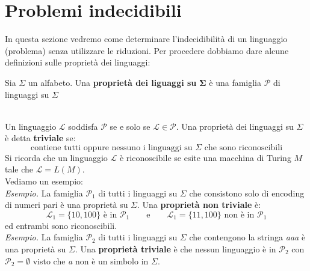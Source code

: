 \section{Problemi indecidibili} 
In questa sezione vedremo come determinare l'indecidibilità di un linguaggio (problema) 
senza utilizzare le riduzioni. Per procedere dobbiamo dare alcune definizioni sulle proprietà dei linguaggi:\smallskip\\
\colorbox{SALZO}{\parbox{\dimexpr\linewidth-2\fboxsep}{\begin{definition}
   Sia $\Sigma$ un alfabeto. Una \textbf{proprietà dei liguaggi su }$\bm{\Sigma}$ è una famiglia $\mathcal{P}$
   di linguaggi su $\Sigma$
\end{definition}}}\smallskip\\
Un linguaggio $\mathcal{L}$ soddisfa $\mathcal{P}$ se e solo se $\mathcal{L} \in \mathcal{P}$. Una
proprietà dei linguaggi su $\Sigma$ è detta \textbf{triviale} se:
\[     \text{contiene tutti oppure nessuno i linguaggi su } \Sigma \text{ che sono riconoscibili}     \]
Si ricorda che un linguaggio $\mathcal{L}$ è riconoscibile se esite una macchina di Turing $M$ tale che $\mathcal{L} = L(M)$.\\
Vediamo un esempio:\smallskip\\
\textit{Esempio.} La famiglia $\mathcal{P}_1$ di tutti i linguaggi su $\Sigma$ che consistono solo di encoding
di numeri pari è una proprietà su $\Sigma$. Una \textbf{proprietà non triviale} è:
\[    \mathcal{L}_1 = \{10,100 \} \text{ è in } \mathcal{P}_1 \qquad \text{e} \qquad  \mathcal{L}_1 = \{11,100 \} \text{ non è in } \mathcal{P}_1 \]
ed entrambi sono riconoscibili.\smallskip\\
\textit{Esempio.} La famiglia $\mathcal{P}_2$ di tutti i linguaggi su $\Sigma$ che contengono la stringa \textit{aaa} è una proprietà su $\Sigma$.
Una \textbf{proprietà triviale} è che nessun linguaggio è in $\mathcal{P}_2$ con $\mathcal{P}_2 = \emptyset$
visto che \textit{a} non è un simbolo in $\Sigma$.

